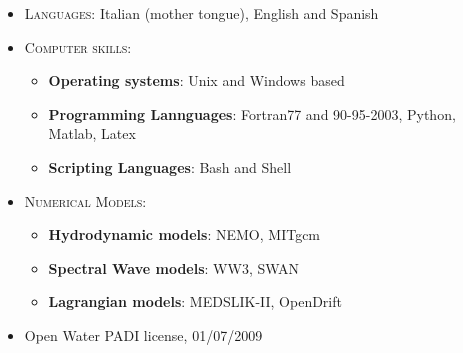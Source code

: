 \documentclass[a4paper, oneside, final]{scrartcl}
\begin{document}
\begin{itemize}
\item \textsc{Languages:} Italian (mother tongue), English and Spanish \\

\item \textsc{Computer skills:}
        \begin{itemize}
           \item \textbf{Operating systems}: Unix and Windows based
           \item \textbf{Programming Lannguages}: Fortran77 and 90-95-2003, Python, Matlab, Latex
           \item \textbf{Scripting Languages}: Bash and Shell\\           
        \end{itemize}
\item \textsc{Numerical Models:}
        \begin{itemize}
           \item \textbf{Hydrodynamic models}: NEMO, MITgcm
           \item \textbf{Spectral Wave models}: WW3, SWAN
           \item \textbf{Lagrangian models}: MEDSLIK-II, OpenDrift\\           
        \end{itemize}                 
\item Open Water PADI license, 01/07/2009
\end{itemize}
\end{document}
